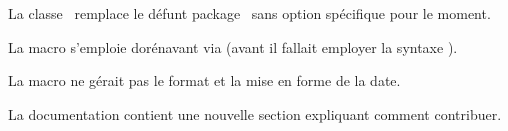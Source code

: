 \begin{tdocbreak}
	\item La classe \thisproj\ remplace le défunt package \thisproj\ sans option spécifique pour le moment.

	\item La macro  s'emploie dorénavant via  (avant il fallait employer la syntaxe ).
\end{tdocbreak}


\begin{tdocfix}
	\item La macro  ne gérait pas le format et la mise en forme de la date.
\end{tdocfix}


\begin{tdocnew}
	\item La documentation contient une nouvelle section expliquant comment contribuer.
\end{tdocnew}
